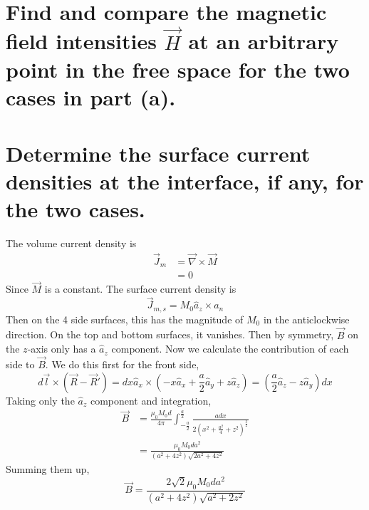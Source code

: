 \documentclass[answers]{exam}
\begin{document}
\begin{questions}
\begin{parts}
    \part{Find and compare the magnetic field intensities $\vec H$ at an arbitrary point in the free space for the two cases in part (a).}
    \part{Determine the surface current densities at the interface, if any, for the two cases.}
\end{parts}


\begin{solution}
    The volume current density is
    \begin{align*}
        \vec J_m &= \vec\nabla \times \vec M \\
                 &= 0
    \end{align*}
    Since $\vec M$ is a constant. The surface current density is
    $$\vec J_{m,s} = M_0\hat a_z \times a_n$$
    Then on the 4 side surfaces, this has the magnitude of $M_0$ in the anticlockwise direction. On the top and bottom surfaces, it vanishes. Then by symmetry, $\vec B$ on the $z$-axis only has a $\hat a_z$ component. Now we calculate the contribution of each side to $\vec B$. We do this first for the front side,
    $$d\vec l \times (\vec R - \vec R') = dx\hat a_x \times \left(-x\hat a_x + \frac{a}{2}\hat a_y + z\hat a_z\right) = (\frac{a}{2} \hat a_z - z \hat a_y)dx$$
    Taking only the $\hat a_z$ component and integration,
    \begin{align*}
        \vec B &= \frac{\mu_0 M_0 d}{4\pi} \int_{-\frac{a}{2}}^{\frac{a}{2}} \frac{adx}{2(x^2 + \frac{a^2}{4} + z^2)^{\frac{3}{2}}} \\
               &= \frac{\mu_0M_0da^2}{(a^2+4z^2)\sqrt{2a^2+4z^2}}
    \end{align*}
    Summing them up,
    $$\vec B = \frac{2\sqrt{2}\mu_0M_0da^2}{(a^2+4z^2)\sqrt{a^2+2z^2}}$$
\end{solution}



\end{questions}
\end{document}
